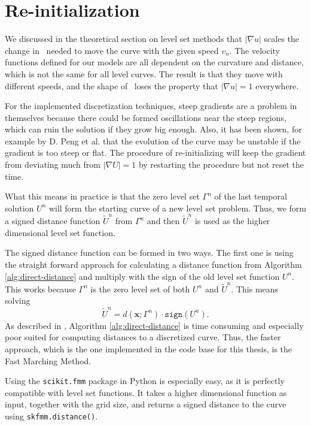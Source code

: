 \section{Re-initialization} \label{sec:reinitialization}
We discussed in the theoretical section on level set methods that $|\nabla u|$ scales the change in \uxt\ needed to move the curve with the given speed $v_n$. The velocity functions defined for our models are all dependent on the curvature and distance, which is not the same for all level curves. The result is that they move with different speeds, and the shape of \uxt\ loses the property that $|\nabla u|=1$ everywhere. 

For the implemented discretization techniques, steep gradients are a problem in themselves because there could be formed oscillations near the steep regions, which can ruin the solution if they grow big enough. Also, it has been shown, for example by D. Peng et al. \cite{Fast-PDE} that the evolution of the curve may be unstable if the gradient is too steep or flat. The procedure of re-initializing will keep the gradient from deviating much from $|\nabla U|=1$ by restarting the procedure but not reset the time. 

What this means in practice is that the zero level set $\Gamma^n$ of the last temporal solution $U^{n}$ will form the starting curve of a new level set problem. Thus, we form a signed distance function $\tilde{U}^n$ from $\Gamma^n$ and then $\tilde{U}^n$ is used as the higher dimensional level set function.

The signed distance function can be formed in two ways. The first one is using the straight forward approach for calculating a distance function from Algorithm \ref{alg:direct-distance} and multiply with the sign of the old level set function $U^n$. This works because $\Gamma^n$ is the zero level set of both $U^n$ and $\tilde{U}^n$. This means solving
\begin{equation}
    \tilde{U}^{n} = d(\mathbf{x}; \Gamma^{n})\cdot \texttt{sign}(U^{n}).
\end{equation}
As described in , Algorithm \ref{alg:direct-distance} is time consuming and especially poor suited for computing distances to a discretized curve. Thus, the faster approach, which is the one implemented in the code base for this thesis, is the Fast Marching Method.

Using the \texttt{scikit.fmm} package in Python is especially easy, as it is perfectly compatible with level set functions. It takes a higher dimensional function as input, together with the grid size, and returns a signed distance to the curve using \texttt{skfmm.distance()}.

